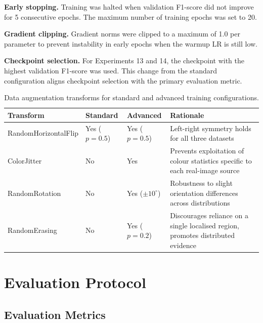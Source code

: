 \textbf{Early stopping.} Training was halted when validation F1-score did not improve for 5
consecutive epochs. The maximum number of training epochs was set to 20.

\textbf{Gradient clipping.} Gradient norms were clipped to a maximum of 1.0 per parameter to
prevent instability in early epochs when the warmup LR is still low.

\textbf{Checkpoint selection.} For Experiments 13 and 14, the checkpoint with the highest
validation F1-score was used. This change from the standard configuration aligns checkpoint
selection with the primary evaluation metric.

\begin{table}[htb]
  \centering
  \caption{Data augmentation transforms for standard and advanced training configurations.}
  \label{tab:augmentation}
  \begin{tabular}{lllp{5cm}}
    \hline
    \textbf{Transform} & \textbf{Standard} & \textbf{Advanced} & \textbf{Rationale} \\
    \hline
    RandomHorizontalFlip & Yes ($p=0.5$) & Yes ($p=0.5$) & Left-right symmetry holds for all three datasets \\
    ColorJitter          & No            & Yes            & Prevents exploitation of colour statistics specific to each real-image source \\
    RandomRotation       & No            & Yes ($\pm10^\circ$) & Robustness to slight orientation differences across distributions \\
    RandomErasing~\cite{zhong2020random} & No            & Yes ($p=0.2$)  & Discourages reliance on a single localised region, promotes distributed evidence \\
    \hline
  \end{tabular}
\end{table}


\pagebreak

\section{Evaluation Protocol}
\label{sec:eval_protocol}

\subsection{Evaluation Metrics}
\label{sec:metrics}

